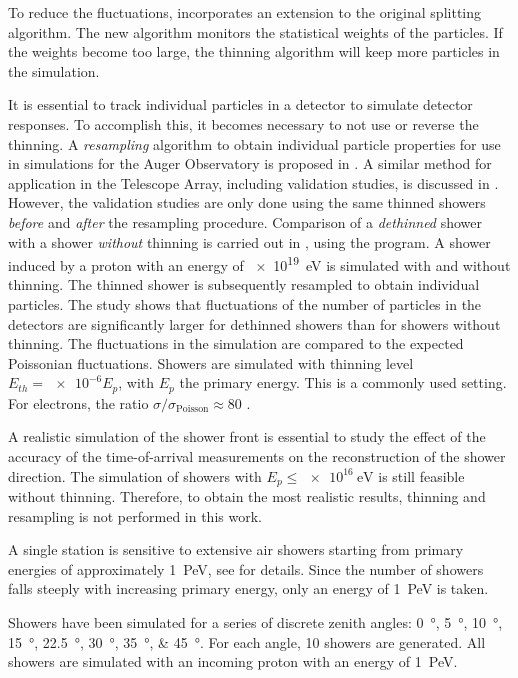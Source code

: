 To reduce the fluctuations, \aires incorporates an extension to the
original splitting algorithm.  The new algorithm monitors the statistical
weights of the particles. If the weights become too large, the thinning
algorithm will keep more particles in the simulation.

It is essential to track individual particles in a detector to simulate detector
responses. To accomplish this, it becomes necessary to not use or reverse the
thinning.
A \emph{resampling} algorithm to obtain individual particle properties for use
in simulations for the Auger Observatory is proposed in \cite{Billoir:2008}.
A similar method for application in the Telescope Array, including validation
studies, is discussed in \cite{Stokes:2011}. However, the validation studies are only
done using the same thinned showers \emph{before} and \emph{after} the
resampling procedure.  Comparison of a \emph{dethinned} shower with a shower
\emph{without} thinning is carried out in \cite{Bruijn:2009}, using the \corsika
program.  A shower induced by a proton with an energy of \SI{e19}{\electronvolt}
is simulated with and without thinning.  The thinned shower is subsequently
resampled to obtain individual particles.  The study shows that fluctuations of
the number of particles in the detectors are significantly larger for dethinned
showers than for showers without thinning.  The fluctuations in the simulation
are compared to the expected Poissonian fluctuations. Showers are simulated with
thinning level $E_{th} = \num{e-6} E_p$, with $E_p$ the primary energy. This is
a commonly used setting. For electrons, the ratio $\sigma /
\sigma_\mathrm{Poisson} \approx 80$ \cite{Bruijn:2009}.

A realistic simulation of the shower front is essential to study the effect of
the accuracy of the time-of-arrival measurements on the reconstruction of the
shower direction.  The simulation of showers with $E_p \leq
\SI{e16}{\electronvolt}$ is still feasible without thinning.  Therefore, to
obtain the most realistic results, thinning and resampling is not performed in
this work.

A single \hisparc station is sensitive to extensive air showers starting from
primary energies of approximately \SI{1}{\peta\electronvolt}, see
 for details.  Since the number of showers falls
steeply with increasing primary energy, only an energy of
\SI{1}{\peta\electronvolt} is taken.

Showers have been simulated for a series of discrete zenith angles:
\SIlist{0;5;10;15;22.5;30;35;45}{\degree}.  For each angle, \num{10} showers
are generated. All showers are simulated with an incoming proton with an
energy of \SI{1}{\peta\electronvolt}.


